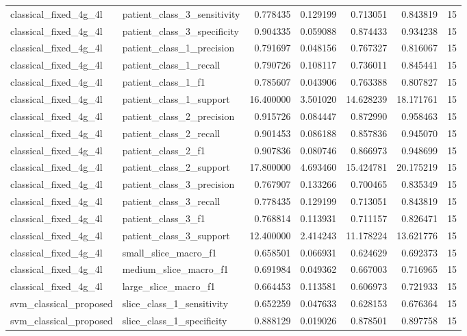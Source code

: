 \begin{tabular}{llrrrrr}
classical_fixed_4g_4l & patient_class_3_sensitivity & 0.778435 & 0.129199 & 0.713051 & 0.843819 & 15 \\
classical_fixed_4g_4l & patient_class_3_specificity & 0.904335 & 0.059088 & 0.874433 & 0.934238 & 15 \\
classical_fixed_4g_4l & patient_class_1_precision & 0.791697 & 0.048156 & 0.767327 & 0.816067 & 15 \\
classical_fixed_4g_4l & patient_class_1_recall & 0.790726 & 0.108117 & 0.736011 & 0.845441 & 15 \\
classical_fixed_4g_4l & patient_class_1_f1 & 0.785607 & 0.043906 & 0.763388 & 0.807827 & 15 \\
classical_fixed_4g_4l & patient_class_1_support & 16.400000 & 3.501020 & 14.628239 & 18.171761 & 15 \\
classical_fixed_4g_4l & patient_class_2_precision & 0.915726 & 0.084447 & 0.872990 & 0.958463 & 15 \\
classical_fixed_4g_4l & patient_class_2_recall & 0.901453 & 0.086188 & 0.857836 & 0.945070 & 15 \\
classical_fixed_4g_4l & patient_class_2_f1 & 0.907836 & 0.080746 & 0.866973 & 0.948699 & 15 \\
classical_fixed_4g_4l & patient_class_2_support & 17.800000 & 4.693460 & 15.424781 & 20.175219 & 15 \\
classical_fixed_4g_4l & patient_class_3_precision & 0.767907 & 0.133266 & 0.700465 & 0.835349 & 15 \\
classical_fixed_4g_4l & patient_class_3_recall & 0.778435 & 0.129199 & 0.713051 & 0.843819 & 15 \\
classical_fixed_4g_4l & patient_class_3_f1 & 0.768814 & 0.113931 & 0.711157 & 0.826471 & 15 \\
classical_fixed_4g_4l & patient_class_3_support & 12.400000 & 2.414243 & 11.178224 & 13.621776 & 15 \\
classical_fixed_4g_4l & small_slice_macro_f1 & 0.658501 & 0.066931 & 0.624629 & 0.692373 & 15 \\
classical_fixed_4g_4l & medium_slice_macro_f1 & 0.691984 & 0.049362 & 0.667003 & 0.716965 & 15 \\
classical_fixed_4g_4l & large_slice_macro_f1 & 0.664453 & 0.113581 & 0.606973 & 0.721933 & 15 \\
svm_classical_proposed & slice_class_1_sensitivity & 0.652259 & 0.047633 & 0.628153 & 0.676364 & 15 \\
svm_classical_proposed & slice_class_1_specificity & 0.888129 & 0.019026 & 0.878501 & 0.897758 & 15 \\

\end{tabular}
